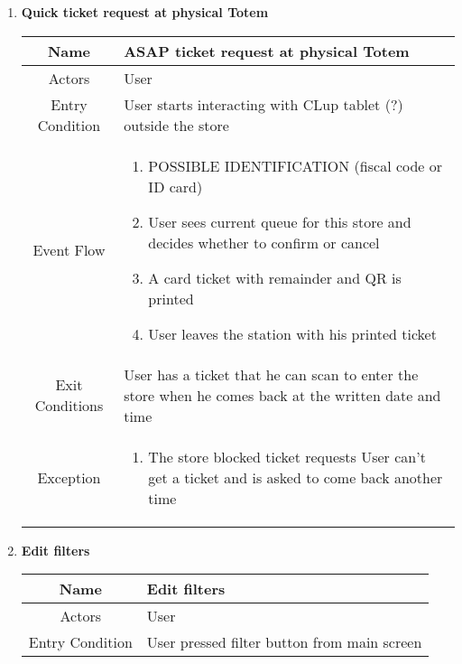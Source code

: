 \begin{enumerate}
\item \textbf{Quick ticket request at physical Totem}

\begin{table}[H]
{
	\begin{tabular}{|c|p{14cm}|}
		\hline
		Name & ASAP ticket request at physical Totem\\
		\hline
		Actors & User\\
		\hline
		Entry Condition & User starts interacting with CLup tablet (?) outside the store\\
		\hline
		
		Event Flow & \begin{enumerate}
			\item POSSIBLE IDENTIFICATION (fiscal code or ID card)
			\item User sees current queue for this store and decides whether to confirm or cancel
			\item A card ticket with remainder and QR is printed
			\item User leaves the station with his printed ticket
			
		\end{enumerate}\\
		
		\hline
		Exit Conditions & User has a ticket that he can scan to enter the store when he comes back at the written date and time\\
		\hline
		
		Exception & \begin{enumerate}
			\item The store blocked ticket requests\newline
			User can’t get a ticket and is asked to come back another time
			
		\end{enumerate}\\
		
		\hline
	\end{tabular}
}
\end{table}

\item \textbf{Edit filters}

\begin{table}[H]
{
	\begin{tabular}{|c|p{14cm}|}
		\hline
		Name & Edit filters\\
		\hline
		Actors & User\\
		\hline
		Entry Condition & User pressed filter button from main screen\\
		\hline
		

\end{tabular}}
\end{table}
\end{enumerate}
